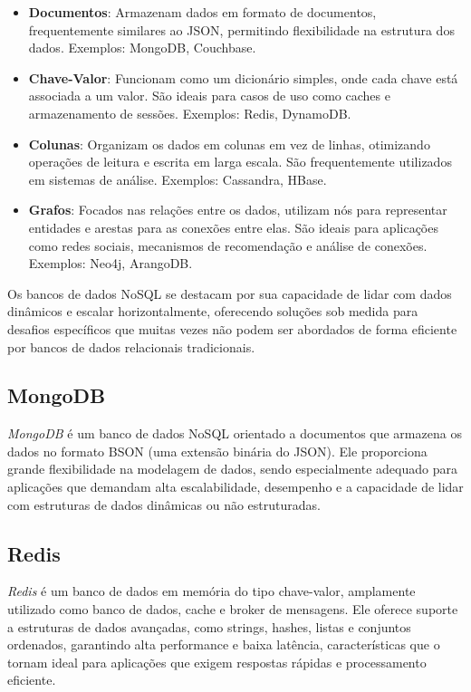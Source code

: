 \begin{itemize}
    \item \textbf{Documentos}: Armazenam dados em formato de documentos, frequentemente similares ao JSON, permitindo flexibilidade na estrutura dos dados. Exemplos: MongoDB, Couchbase.
    \item \textbf{Chave-Valor}: Funcionam como um dicionário simples, onde cada chave está associada a um valor. São ideais para casos de uso como caches e armazenamento de sessões. Exemplos: Redis, DynamoDB.
    \item \textbf{Colunas}: Organizam os dados em colunas em vez de linhas, otimizando operações de leitura e escrita em larga escala. São frequentemente utilizados em sistemas de análise. Exemplos: Cassandra, HBase.
    \item \textbf{Grafos}: Focados nas relações entre os dados, utilizam nós para representar entidades e arestas para as conexões entre elas. São ideais para aplicações como redes sociais, mecanismos de recomendação e análise de conexões. Exemplos: Neo4j, ArangoDB.
\end{itemize}

Os bancos de dados NoSQL se destacam por sua capacidade de lidar com dados dinâmicos e escalar horizontalmente, oferecendo soluções sob medida para desafios específicos que muitas vezes não podem ser abordados de forma eficiente por bancos de dados relacionais tradicionais.

\subsection{MongoDB}

\emph{MongoDB} é um banco de dados NoSQL orientado a documentos que armazena os dados no formato BSON (uma extensão binária do JSON). Ele proporciona grande flexibilidade na modelagem de dados, sendo especialmente adequado para aplicações que demandam alta escalabilidade, desempenho e a capacidade de lidar com estruturas de dados dinâmicas ou não estruturadas.

\subsection{Redis}

\emph{Redis} é um banco de dados em memória do tipo chave-valor, amplamente utilizado como banco de dados, cache e broker de mensagens. Ele oferece suporte a estruturas de dados avançadas, como strings, hashes, listas e conjuntos ordenados, garantindo alta performance e baixa latência, características que o tornam ideal para aplicações que exigem respostas rápidas e processamento eficiente.


